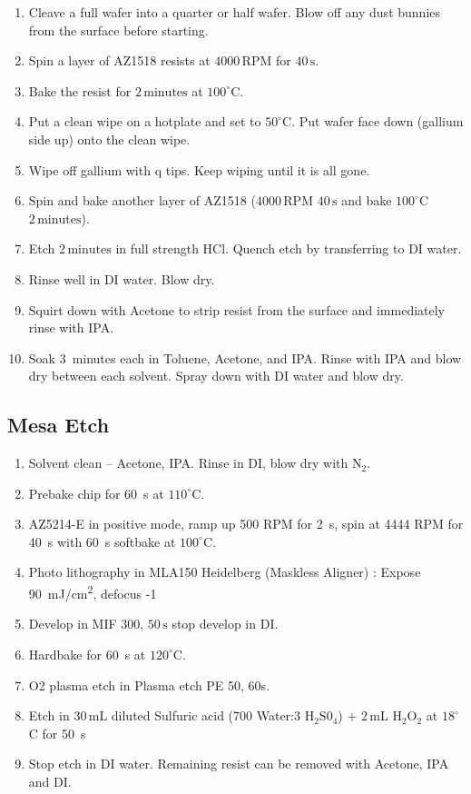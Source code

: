 \begin{enumerate}
\item Cleave a full wafer into a quarter or half wafer. Blow off any dust bunnies from the surface before starting.
\item Spin a layer of AZ1518 resists at $4000 \,\mathrm{RPM}$ for $40\,\mathrm{s}$.
\item Bake the resist for $2\,\mathrm{minutes}$ at $100^\circ$C.
\item Put a clean wipe on a hotplate and set to $50^\circ$C. Put wafer face down (gallium side up) onto the clean wipe.
\item Wipe off gallium with q tips. Keep wiping until it is all gone.
\item Spin and bake another layer of AZ1518 ($4000 \,\mathrm{RPM}$ $40\,\mathrm{s}$ and bake $100^\circ$C $2\,\mathrm{minutes}$).
\item Etch $2 \,\mathrm{minutes}$ in full strength HCl. Quench etch by transferring to DI water.
\item Rinse well in DI water. Blow dry.
\item Squirt down with Acetone to strip resist from the surface and immediately rinse with IPA.
\item Soak 3~minutes each in Toluene, Acetone, and IPA. Rinse with IPA and blow dry between each solvent. Spray down with DI water and blow dry.
\end{enumerate}

\subsection{Mesa Etch}
\begin{enumerate}
\item Solvent clean – Acetone, IPA. Rinse in DI, blow dry with $\mathrm{N_2}$.
\item Prebake chip for \qty{60}{s} at $110^\circ$C.
\item AZ5214-E in positive mode, ramp up 500 RPM for \qty{2}{s}, spin at 4444 RPM for \qty{40}{s} with \qty{60}{s} softbake at $100^\circ$C.
\item Photo lithography in MLA150 Heidelberg (Maskless Aligner) : Expose \qty{90}{mJ/cm^2}, defocus -1 
\item Develop in MIF 300, $50\,\mathrm{s}$ stop develop in DI.
\item Hardbake for \qty{60}{s} at $120^\circ$C.
\item O2 plasma etch in Plasma etch PE 50, 60s.
\item Etch in $30\,\mathrm{mL}$ diluted Sulfuric acid (700 Water:3 $\mathrm{H_2S0_4}$) + $2 \,\mathrm{mL}$ $\mathrm{H_2O_2}$ at $18^\circ$C for \qty{50}{s}
\item Stop etch in DI water. Remaining resist can be removed with Acetone, IPA and DI.
\end{enumerate}




